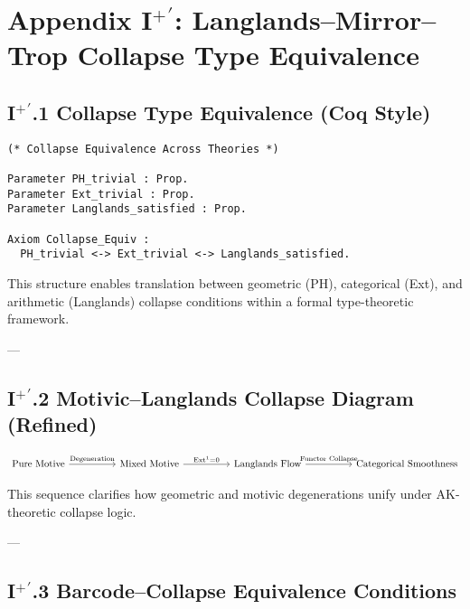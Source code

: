 \documentclass[11pt]{article}
\begin{document}

\section*{Appendix I$^+\!{}^\prime$: Langlands–Mirror–Trop Collapse Type Equivalence}

\subsection*{I$^+\!{}^\prime$.1 Collapse Type Equivalence (Coq Style)}

\begin{lstlisting}[language=Coq, caption=Collapse Type Equivalence in Coq]
(* Collapse Equivalence Across Theories *)

Parameter PH_trivial : Prop.
Parameter Ext_trivial : Prop.
Parameter Langlands_satisfied : Prop.

Axiom Collapse_Equiv :
  PH_trivial <-> Ext_trivial <-> Langlands_satisfied.
\end{lstlisting}

This structure enables translation between geometric (PH), categorical (Ext),  
and arithmetic (Langlands) collapse conditions within a formal type-theoretic framework.

---

\subsection*{I$^+\!{}^\prime$.2 Motivic–Langlands Collapse Diagram (Refined)}

\[
\begin{tikzcd}[column sep=huge, row sep=large]
\text{Pure Motive} \arrow[r, "\text{Degeneration}"]
& \text{Mixed Motive} \arrow[r, "\mathrm{Ext}^1 = 0"]
& \text{Langlands Flow} \arrow[r, "\text{Functor Collapse}"]
& \text{Categorical Smoothness}
\end{tikzcd}
\]

This sequence clarifies how geometric and motivic degenerations unify  
under AK-theoretic collapse logic.

---

\subsection*{I$^+\!{}^\prime$.3 Barcode–Collapse Equivalence Conditions}
\end{document}
